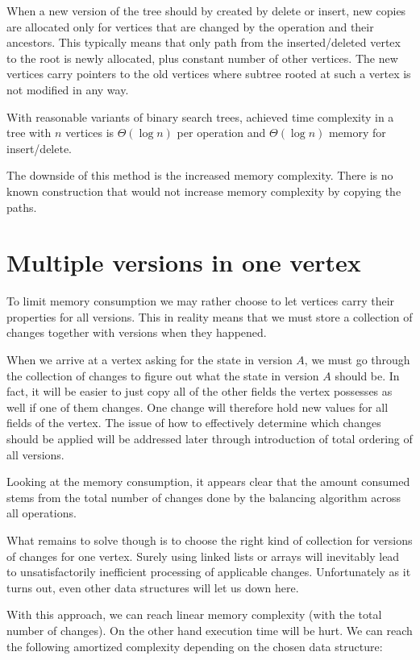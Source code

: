 When a new version of the tree should by created by delete or insert, new copies are allocated only for vertices that are changed by the operation and their ancestors. This typically means that only path from the inserted/deleted vertex to the root is newly allocated, plus constant number of other vertices. The new vertices carry pointers to the old vertices where subtree rooted at such a vertex is not modified in any way.

With reasonable variants of binary search trees, achieved time complexity in a tree with $n$ vertices is $\Theta(\log n)$ per operation and $\Theta(\log n)$ memory for insert/delete.

The downside of this method is the increased memory complexity. There is no known construction that would not increase memory complexity by copying the paths.

\section{Multiple versions in one vertex}

To limit memory consumption we may rather choose to let vertices carry their properties for all versions. This in reality means that we must store a collection of changes together with versions when they happened. 

When we arrive at a vertex asking for the state in version $A$, we must go through the collection of changes to figure out what the state in version $A$ should be. In fact, it will be easier to just copy all of the other fields the vertex possesses as well if one of them changes. One change will therefore hold new values for all fields of the vertex. The issue of how to effectively determine which changes should be applied will be addressed later through introduction of total ordering of all versions.

Looking at the memory consumption, it appears clear that the amount consumed stems from the total number of changes done by the balancing algorithm across all operations.

What remains to solve though is to choose the right kind of collection for versions of changes for one vertex. Surely using linked lists or arrays will inevitably lead to unsatisfactorily inefficient processing of applicable changes. Unfortunately as it turns out, even other data structures will let us down here.

With this approach, we can reach linear memory complexity (with the total number of changes). On the other hand execution time will be hurt. We can reach the following amortized complexity depending on the chosen data structure:

